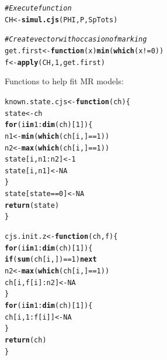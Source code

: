 \documentclass[a4paper, 10pt]{scrartcl}\usepackage[]{graphicx}\usepackage[]{color}
\makeatletter
\newcommand{\hlnum}[1]{\textcolor[rgb]{0.686,0.059,0.569}{#1}}%
\newcommand{\hlcom}[1]{\textcolor[rgb]{0.678,0.584,0.686}{\textit{#1}}}%
\newcommand{\hlopt}[1]{\textcolor[rgb]{0,0,0}{#1}}%
\newcommand{\hlstd}[1]{\textcolor[rgb]{0.345,0.345,0.345}{#1}}%
\newcommand{\hlkwa}[1]{\textcolor[rgb]{0.161,0.373,0.58}{\textbf{#1}}}%
\newcommand{\hlkwb}[1]{\textcolor[rgb]{0.69,0.353,0.396}{#1}}%
\newcommand{\hlkwc}[1]{\textcolor[rgb]{0.333,0.667,0.333}{#1}}%
\newcommand{\hlkwd}[1]{\textcolor[rgb]{0.737,0.353,0.396}{\textbf{#1}}}%
\newenvironment{kframe}{%
 \def\at@end@of@kframe{}%
 \ifinner\ifhmode%
  \def\at@end@of@kframe{\end{minipage}}%
  \begin{minipage}{\columnwidth}%
 \fi\fi%
 \def\FrameCommand##1{\hskip\@totalleftmargin \hskip-\fboxsep
 \colorbox{shadecolor}{##1}\hskip-\fboxsep
     \hskip-\linewidth \hskip-\@totalleftmargin \hskip\columnwidth}%
 \MakeFramed {\advance\hsize-\width
   \@totalleftmargin\z@ \linewidth\hsize
   \@setminipage}}%
 {\par\unskip\endMakeFramed%
 \at@end@of@kframe}
\newenvironment{knitrout}{}{} %
\makeatother
\begin{document}
\begin{knitrout}
\color{fgcolor}\begin{kframe}
\begin{alltt}
\hlcom{# Execute function}
\hlstd{CH} \hlkwb{<-} \hlkwd{simul.cjs}\hlstd{(PHI, P, SpTots)}

\hlcom{# Create vector with occasion of marking}
\hlstd{get.first} \hlkwb{<-} \hlkwa{function}\hlstd{(}\hlkwc{x}\hlstd{)} \hlkwd{min}\hlstd{(}\hlkwd{which}\hlstd{(x}\hlopt{!=}\hlnum{0}\hlstd{))}
\hlstd{f} \hlkwb{<-} \hlkwd{apply}\hlstd{(CH,} \hlnum{1}\hlstd{, get.first)}
\end{alltt}
\end{kframe}
\end{knitrout}


Functions to help fit MR models:

\begin{knitrout}
\color{fgcolor}\begin{kframe}
\begin{alltt}
\hlstd{known.state.cjs} \hlkwb{<-} \hlkwa{function}\hlstd{(}\hlkwc{ch}\hlstd{)\{}
  \hlstd{state} \hlkwb{<-} \hlstd{ch}
  \hlkwa{for} \hlstd{(i} \hlkwa{in} \hlnum{1}\hlopt{:}\hlkwd{dim}\hlstd{(ch)[}\hlnum{1}\hlstd{])\{}
    \hlstd{n1} \hlkwb{<-} \hlkwd{min}\hlstd{(}\hlkwd{which}\hlstd{(ch[i,]}\hlopt{==}\hlnum{1}\hlstd{))}
    \hlstd{n2} \hlkwb{<-} \hlkwd{max}\hlstd{(}\hlkwd{which}\hlstd{(ch[i,]}\hlopt{==}\hlnum{1}\hlstd{))}
    \hlstd{state[i,n1}\hlopt{:}\hlstd{n2]} \hlkwb{<-} \hlnum{1}
    \hlstd{state[i,n1]} \hlkwb{<-} \hlnum{NA}
  \hlstd{\}}
  \hlstd{state[state}\hlopt{==}\hlnum{0}\hlstd{]} \hlkwb{<-} \hlnum{NA}
  \hlkwd{return}\hlstd{(state)}
\hlstd{\}}


\hlstd{cjs.init.z} \hlkwb{<-} \hlkwa{function}\hlstd{(}\hlkwc{ch}\hlstd{,}\hlkwc{f}\hlstd{)\{}
  \hlkwa{for} \hlstd{(i} \hlkwa{in} \hlnum{1}\hlopt{:}\hlkwd{dim}\hlstd{(ch)[}\hlnum{1}\hlstd{])\{}
    \hlkwa{if} \hlstd{(}\hlkwd{sum}\hlstd{(ch[i,])}\hlopt{==}\hlnum{1}\hlstd{)} \hlkwa{next}
    \hlstd{n2} \hlkwb{<-} \hlkwd{max}\hlstd{(}\hlkwd{which}\hlstd{(ch[i,]}\hlopt{==}\hlnum{1}\hlstd{))}
    \hlstd{ch[i,f[i]}\hlopt{:}\hlstd{n2]} \hlkwb{<-} \hlnum{NA}
  \hlstd{\}}
  \hlkwa{for} \hlstd{(i} \hlkwa{in} \hlnum{1}\hlopt{:}\hlkwd{dim}\hlstd{(ch)[}\hlnum{1}\hlstd{])\{}
    \hlstd{ch[i,}\hlnum{1}\hlopt{:}\hlstd{f[i]]} \hlkwb{<-} \hlnum{NA}
  \hlstd{\}}
  \hlkwd{return}\hlstd{(ch)}
\hlstd{\}}
\end{alltt}
\end{kframe}
\end{knitrout}
\end{document}
